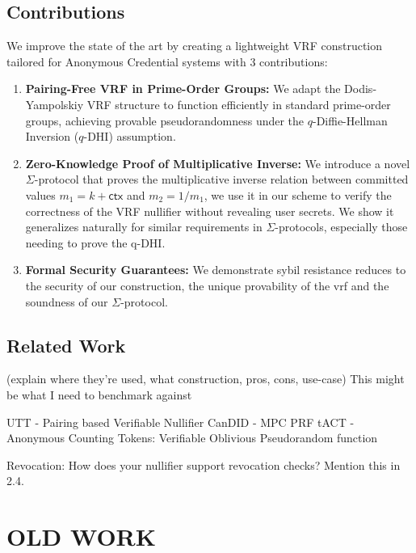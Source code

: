 \subsection{Contributions}

\noindent We improve the state of the art by creating a lightweight VRF construction tailored for Anonymous Credential systems with 3 contributions:
\begin{enumerate}
        \item \textbf{Pairing-Free VRF in Prime-Order Groups:} We adapt the Dodis-Yampolskiy VRF structure to function efficiently in standard prime-order groups, achieving provable pseudorandomness under the $q$-Diffie-Hellman Inversion ($q$-DHI) assumption.

        \item \textbf{Zero-Knowledge Proof of Multiplicative Inverse:} We introduce a novel $\Sigma$-protocol that proves the multiplicative inverse relation between committed values $m_1 = k + \textsf{ctx}$ and $m_2 = 1/m_1$, we use it in our scheme to verify the correctness of the VRF nullifier without revealing user secrets. We show it generalizes naturally for similar requirements in $\Sigma$-protocols, especially those needing to prove the q-DHI.

         \item \textbf{Formal Security Guarantees:} We demonstrate sybil resistance reduces to the security of our construction, the unique provability of the vrf and the soundness of our $\Sigma$-protocol.
\end{enumerate}


\subsection{Related Work}
(explain where they're used, what construction, pros, cons, use-case) This might be what I need to benchmark against

UTT - Pairing based Verifiable Nullifier
CanDID - MPC PRF
tACT - 
Anonymous Counting Tokens: Verifiable Oblivious Pseudorandom function






Revocation: How does your nullifier support revocation checks? Mention this in 2.4.


\section{OLD WORK}








